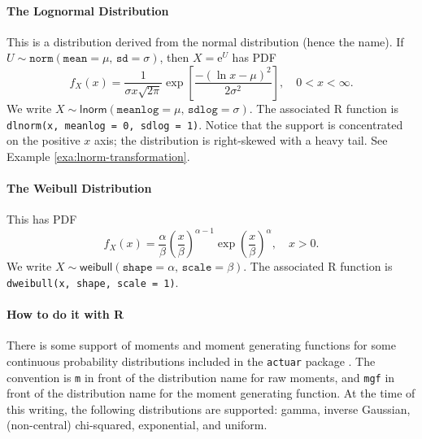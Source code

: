 \documentclass[captions=tableheading]{scrbook}
\begin{document}
\paragraph*{The Lognormal Distribution}
\label{sub:The-Lognormal-Distribution}

This is a distribution derived from the normal distribution (hence the name). If \(U\sim\mathtt{norm}(\mathtt{mean}=\mu,\,\mathtt{sd}=\sigma)\), then \( X = \mathrm{e}^{U} \) has PDF
\begin{equation}
f_{X}(x)=\frac{1}{\sigma x\sqrt{2\pi}}\exp\left[\frac{-(\ln x-\mu)^{2}}{2\sigma^{2}}\right],\quad0<x<\infty.
\end{equation}
We write \(X\sim\mathsf{lnorm}(\mathtt{meanlog}=\mu,\,\mathtt{sdlog}=\sigma)\). The associated \textsf{R} function is \texttt{dlnorm(x, meanlog = 0, sdlog = 1)}. Notice that the support is concentrated on the positive \(x\) axis; the distribution is right-skewed with a heavy tail. See Example \ref{exa:lnorm-transformation}.


\paragraph*{The Weibull Distribution}
\label{sub:The-Weibull-Distribution}

This has PDF
\begin{equation}
f_{X}(x)=\frac{\alpha}{\beta}\left(\frac{x}{\beta}\right)^{\alpha-1}\exp\left(\frac{x}{\beta}\right)^{\alpha},\quad x>0.
\end{equation}
We write \(X\sim\mathsf{weibull}(\mathtt{shape}=\alpha,\,\mathtt{scale}=\beta)\). The associated \textsf{R} function is \texttt{dweibull(x, shape, scale = 1)}. 


\paragraph*{How to do it with \textsf{R}}

There is some support of moments and moment generating functions for some continuous probability distributions included in the \texttt{actuar} package \cite{Dutangactuar}. The convention is \texttt{m} in front of the distribution name for raw moments, and \texttt{mgf} in front of the distribution name for the moment generating function. At the time of this writing, the following distributions are supported: gamma, inverse Gaussian, (non-central) chi-squared, exponential, and uniform.
\end{document}
